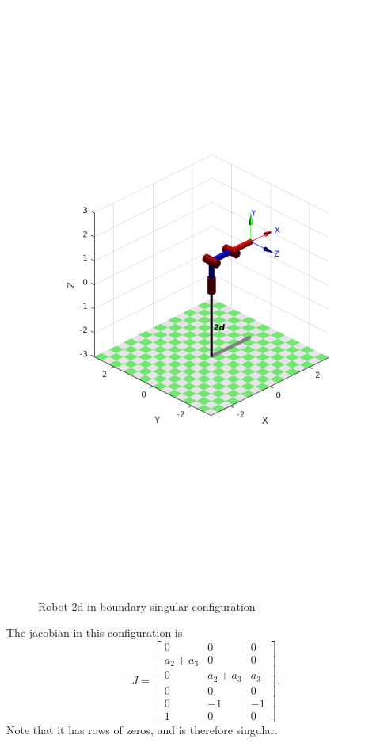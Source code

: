 \documentclass{../homework}
\begin{document}
\begin{solution}
\begin{parts}
  \begin{figure}[H]
    \centering
    \includegraphics[scale=.3]{1-1.png}
    \label{rob2d}
    \caption{Robot 2d in boundary singular configuration}
  \end{figure}

   The jacobian in this configuration is
   \[ J=
     \begin{bmatrix}
       0 & 0 & 0 \\
       a_2 + a_3 & 0 & 0 \\
       0 & a_2 + a_3 & a_3 \\
       0 & 0 & 0 \\
       0 & -1 & -1 \\
       1 & 0 & 0
     \end{bmatrix}.
   \]
   Note that it has rows of zeros, and is therefore singular.

\end{parts}
\end{solution}
\end{document}
